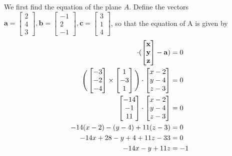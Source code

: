 \documentclass{article}
\begin{document}
\begin{enumerate}
We first find the equation of the plane $A$.  Define the vectors
\(\mathbf{a} = \begin{bmatrix} 2 \\ 4 \\ 3 \end{bmatrix},
  \mathbf{b} = \begin{bmatrix} -1 \\ 2 \\ -1 \end{bmatrix},
  \mathbf{c} = \begin{bmatrix} 3 \\ 1 \\ 4 \end{bmatrix}
\), so that the equation of A is given by
\begin{align}
 [(\mathbf{b} - \mathbf{a}) \times (\mathbf{c} - \mathbf{a})] \cdot 
 (\begin{bmatrix}
   \mathbf{x} \\ \mathbf{y} \\ \mathbf{z}
  \end{bmatrix} - \mathbf{a}) &= 0 \notag \\
\Bigg(\begin{bmatrix} -3 \\ -2 \\ -4 \end{bmatrix} \times
  \begin{bmatrix} 1 \\ -3 \\ 1 \end{bmatrix}\Bigg) \cdot
 \begin{bmatrix} x - 2 \\ y - 4 \\ z - 3 \end{bmatrix} &= 0 \notag \\
 \begin{bmatrix} -14 \\ -1 \\ 11 \end{bmatrix} \cdot
 \begin{bmatrix} x - 2 \\ y - 4 \\ z - 3 \end{bmatrix} &= 0 \notag \\
 -14(x - 2) - (y - 4) + 11(z - 3) &= 0 \notag \\
 -14x + 28 - y + 4 + 11z - 33 &= 0 \notag \\
 -14x - y + 11z &= -1 \label{eqn:a}
\end{align}


\end{enumerate}
\end{document}
